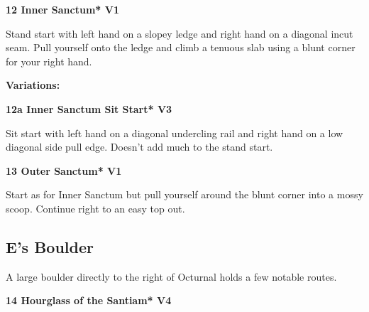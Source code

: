 \begin{multicols}{2}
					\begin{minipage}{\linewidth}	
					\label{rt:Inner Sanctum}
\colorbox{green!20}{
\parbox{0.95\textwidth}{
\textbf{
12 Inner Sanctum* V1    \warn 
}
}
}

					\begin{adjustwidth}{0.5cm}{}				
					Stand start with left hand on a slopey ledge and right hand on a diagonal incut seam. Pull yourself onto the ledge and climb a tenuous slab using a blunt corner for your right hand.
					\end{adjustwidth}
					\end{minipage}
						\begin{adjustwidth}{0.5cm}{}				
						\textbf{Variations:} \newline
							\begin{minipage}{\linewidth}	
							\label{vr:Inner Sanctum Sit Start}
\colorbox{green!20}{
\parbox{0.95\textwidth}{
\textbf{
12a Inner Sanctum Sit Start* V3   
}
}
}

							\begin{adjustwidth}{0.5cm}{}				
							Sit start with left hand on a diagonal undercling rail and right hand on a low diagonal side pull edge. Doesn't add much to the stand start.
							\end{adjustwidth}
							\end{minipage}
						\end{adjustwidth}
					\begin{minipage}{\linewidth}	
					\label{rt:Outer Sanctum}
\colorbox{green!20}{
\parbox{0.95\textwidth}{
\textbf{
13 Outer Sanctum* V1   
}
}
}

					\begin{adjustwidth}{0.5cm}{}				
					Start as for Inner Sanctum but pull yourself around the blunt corner into a mossy scoop. Continue right to an easy top out.
					\end{adjustwidth}
					\end{minipage}
			\subsection*{E's Boulder}\label{bf:E's Boulder}
			\begin{minipage}{\columnwidth}
			A large boulder directly to the right of Octurnal holds a few notable routes.
			\end{minipage}
			
					\begin{minipage}{\linewidth}	
					\label{rt:Hourglass of the Santiam}
\colorbox{RoyalBlue!20}{
\parbox{0.95\textwidth}{
\textbf{
14 Hourglass of the Santiam* V4      
}
}
}


\end{minipage}
\end{multicols}
